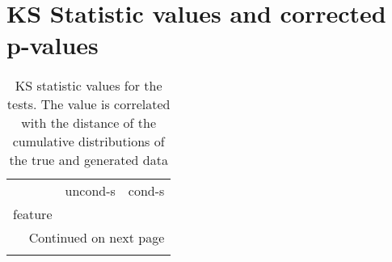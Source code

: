 \appendix
\chapter{KS Statistic values and corrected p-values}

\begin{longtable}{lrr}
	\caption[KS statistic values]{ \small KS statistic values for the tests. The value is correlated with the distance of the cumulative distributions of the true and generated data}\\
	\toprule
	{} &  uncond-s &    cond-s \\
	feature                       &           &           \\
	\midrule
	\endhead
	\midrule
	\multicolumn{3}{r}{{Continued on next page}} \\
	\midrule
	\endfoot
	

\end{longtable}

